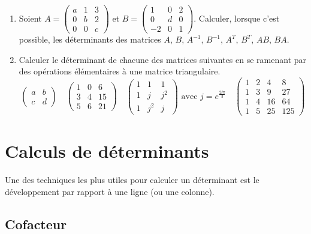 \documentclass[class=report,crop=false]{standalone}
\begin{document}
\begin{miniexercices}
\sauteligne
\begin{enumerate}
  \item Soient $A = \begin{pmatrix}a&1&3\\0&b&2\\0&0&c\end{pmatrix}$
  et $B = \begin{pmatrix}1&0&2\\0&d&0\\-2&0&1\end{pmatrix}$.
  Calculer, lorsque c'est possible, les déterminants des matrices $A$, $B$,
  $A^{-1}$, $B^{-1}$, $A^T$, $B^T$, $AB$, $BA$.

  \item Calculer le déterminant de chacune des matrices suivantes en se
  ramenant par des opérations élémentaires à une matrice triangulaire.
  $$\begin{pmatrix}a&b\\c&d\end{pmatrix}
  \quad
  \begin{pmatrix}1&0&6\\3&4&15\\5&6&21\end{pmatrix}
  \quad
  \begin{pmatrix}1&1&1\\1&j&j^2\\1&j^2&j\end{pmatrix} \text{ avec } j=e^{\frac{2\ii\pi}{3}}\quad
  \begin{pmatrix}1&2&4&8\\1&3&9&27\\1&4&16&64\\1&5&25&125\end{pmatrix}$$
\end{enumerate}
\end{miniexercices}


\section{Calculs de déterminants}

Une des techniques les plus utiles pour calculer un déterminant est
le \og développement par rapport à une ligne (ou une colonne)\fg.

\subsection{Cofacteur}
\end{document}
